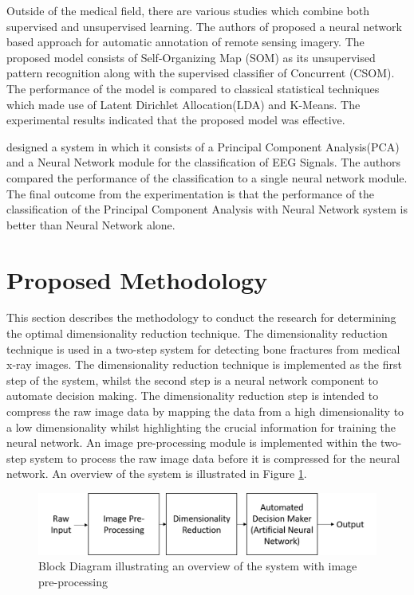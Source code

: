 \documentclass[11pt,twocolumn]{witseiepaper}
\begin{document}
	Outside of the medical field, there are various studies which combine both supervised and unsupervised learning. The authors of \cite{neagoe_new_2014} proposed a neural network based approach for automatic annotation of remote sensing imagery. The proposed model consists of Self-Organizing Map (SOM) as its unsupervised pattern recognition along with the supervised classifier of Concurrent (CSOM). The performance of the model is compared to classical statistical techniques which made use of Latent Dirichlet Allocation(LDA) and K-Means. The experimental results indicated that the proposed model was effective.
	
	\cite{kottaimalai_eeg_2013} designed a system in which it consists of a Principal Component Analysis(PCA) and a Neural Network module for the classification of EEG Signals. The authors compared the performance of the classification to a single neural network module. The final outcome from the experimentation is that the performance of the classification of the Principal Component Analysis with Neural Network system is better than Neural Network alone. 
	
	\section{Proposed Methodology}
	\label{sc: Proposed Methodology}
	This section describes the methodology to conduct the research for determining the optimal dimensionality reduction technique. The dimensionality reduction technique is used in a two-step system for detecting bone fractures from medical x-ray images.
	The dimensionality reduction technique is implemented as the first step of the system, whilst the second step is a neural network component to automate decision making. The dimensionality reduction step is intended to compress the raw image data by mapping the data from a high dimensionality to a low dimensionality whilst highlighting the crucial information for training the neural network. An image pre-processing module is implemented within the two-step system to process the raw image data before it is compressed for the neural network. An overview of the system is illustrated in Figure \ref{fig:system overview}.
	\vspace{-3mm}
	\begin{figure}[!h]
		\centering
		\includegraphics[scale=0.23]{system_overview_2.png}
		\caption{Block Diagram illustrating an overview of the system with image pre-processing }
		\label{fig:system overview}
	\end{figure}
	
\end{document}
